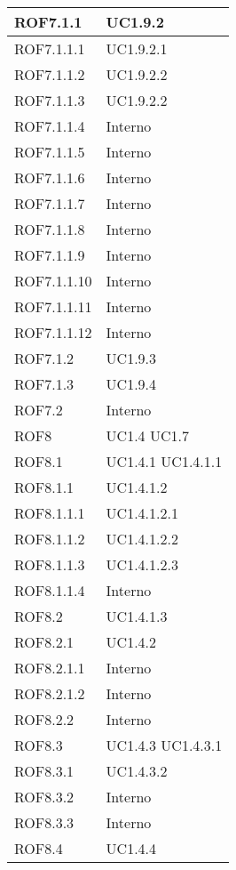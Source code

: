\begin{center}
\begin{longtable}{| p{4cm} | p{4cm} |}
\hline
ROF7.1.1   &  UC1.9.2  \\
\hline
ROF7.1.1.1   &  UC1.9.2.1 \\
\hline
ROF7.1.1.2   &  UC1.9.2.2 \\
\hline
ROF7.1.1.3   &  UC1.9.2.2 \\
\hline
ROF7.1.1.4   &  Interno \\
\hline
ROF7.1.1.5   &  Interno \\
\hline
ROF7.1.1.6   &  Interno \\
\hline
ROF7.1.1.7   &  Interno \\
\hline
ROF7.1.1.8   &  Interno \\
\hline
ROF7.1.1.9   &  Interno \\
\hline
ROF7.1.1.10   &  Interno \\
\hline
ROF7.1.1.11   &  Interno \\
\hline
ROF7.1.1.12   &  Interno \\
\hline
ROF7.1.2   &  UC1.9.3  \\
\hline
ROF7.1.3   &  UC1.9.4  \\
\hline
ROF7.2   &  Interno \\
\hline
ROF8   &  UC1.4 \newline UC1.7 \\
\hline
ROF8.1   &  UC1.4.1 \newline UC1.4.1.1 \\
\hline
ROF8.1.1   &  UC1.4.1.2 \\
\hline
ROF8.1.1.1   &  UC1.4.1.2.1 \\
\hline
ROF8.1.1.2   &  UC1.4.1.2.2 \\
\hline
ROF8.1.1.3   &  UC1.4.1.2.3 \\
\hline
ROF8.1.1.4   &  Interno \\
\hline
ROF8.2   &  UC1.4.1.3 \\
\hline
ROF8.2.1   &  UC1.4.2 \\
\hline
ROF8.2.1.1   &  Interno \\
\hline
ROF8.2.1.2   &  Interno \\
\hline
ROF8.2.2   &  Interno \\
\hline
ROF8.3   &  UC1.4.3 \newline UC1.4.3.1  \\
\hline
ROF8.3.1   &  UC1.4.3.2 \\
\hline
ROF8.3.2   &  Interno \\
\hline
ROF8.3.3   &  Interno \\
\hline
ROF8.4   &  UC1.4.4  \\

\end{longtable}
\end{center}
